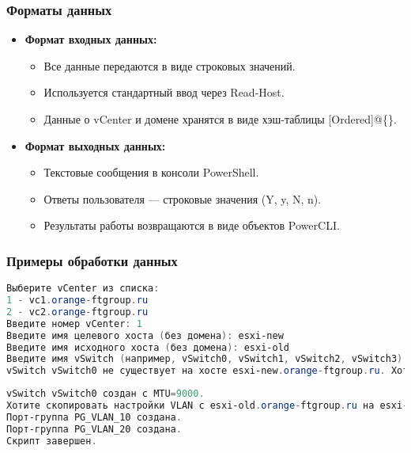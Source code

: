 \subsubsection{Форматы данных}
\begin{itemize}
    \item \textbf{Формат входных данных:}
    \begin{itemize}
        \item Все данные передаются в виде строковых значений.
        \item Используется стандартный ввод через Read-Host.
        \item Данные о vCenter и домене хранятся в виде хэш-таблицы [Ordered]@\{\}.
    \end{itemize}
    
    \item \textbf{Формат выходных данных:}
    \begin{itemize}
        \item Текстовые сообщения в консоли PowerShell.
        \item Ответы пользователя — строковые значения (Y, y, N, n).
        \item Результаты работы возвращаются в виде объектов PowerCLI.
    \end{itemize}
\end{itemize}

\subsubsection{Примеры обработки данных}
\begin{lstlisting}[language=PowerShell, basicstyle=\small\ttfamily]
Выберите vCenter из списка:
1 - vc1.orange-ftgroup.ru
2 - vc2.orange-ftgroup.ru
Введите номер vCenter: 1
Введите имя целевого хоста (без домена): esxi-new
Введите имя исходного хоста (без домена): esxi-old
Введите имя vSwitch (например, vSwitch0, vSwitch1, vSwitch2, vSwitch3) или введите 'q' для выхода: vSwitch0
vSwitch vSwitch0 не существует на хосте esxi-new.orange-ftgroup.ru. Хотите создать его с MTU=9000? (Y/N): Y
\end{lstlisting}

\begin{lstlisting}[language=PowerShell, basicstyle=\small\ttfamily, caption=Пример вывода]
vSwitch vSwitch0 создан с MTU=9000.
Хотите скопировать настройки VLAN с esxi-old.orange-ftgroup.ru на esxi-new.orange-ftgroup.ru ? (Y/N): Y
Порт-группа PG_VLAN_10 создана.
Порт-группа PG_VLAN_20 создана.
Скрипт завершен.
\end{lstlisting}

